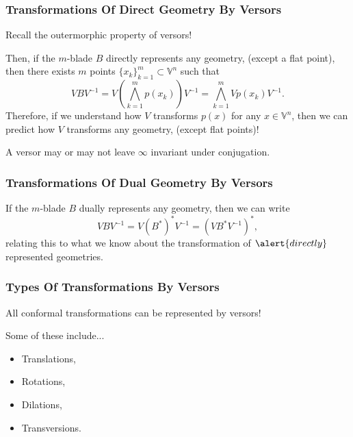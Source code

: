 \documentclass{beamer}
\newcommand{\V}{\mathbb{V}}
\newcommand{\nvai}{\infty}
\begin{document}
\begin{frame}
\frametitle{Transformations Of \alert{Direct} Geometry By Versors}
Recall the \alert{outermorphic} property of versors!\pause

Then, if the $m$-blade $B$ \alert{directly} represents
any geometry, (\alert{except a flat point}), then there exists $m$
points $\{x_k\}_{k=1}^m\subset\V^n$ such that
\begin{equation*}
VBV^{-1} = V\left(\bigwedge_{k=1}^m p(x_k)\right)V^{-1} = \bigwedge_{k=1}^m Vp(x_k)V^{-1}.
\end{equation*}\pause
Therefore, if we understand how $V$ transforms $p(x)$ for any $x\in\V^n$, then we can
predict how $V$ transforms any geometry, (\alert{except flat points})!\pause

A versor may or may not leave $\nvai$ invariant under conjugation.
\end{frame}

\begin{frame}
\frametitle{Transformations Of \alert{Dual} Geometry By Versors}
If the $m$-blade $B$ \alert{dually} represents any geometry, then we can write
\begin{equation*}
VBV^{-1} = V(B^*)^*V^{-1} = (VB^*V^{-1})^*,
\end{equation*}
relating this to what we know about the transformation of $\alert{directly}$ represented geometries.
\end{frame}

\begin{frame}
\frametitle{Types Of Transformations By Versors}
All conformal transformations can be represented by \alert{versors}!

Some of these include...
\begin{itemize}
\item \alert{Translations},
\item \alert{Rotations},
\item \alert{Dilations},
\item \alert{Transversions}.
\end{itemize}
\end{frame}
\end{document}
